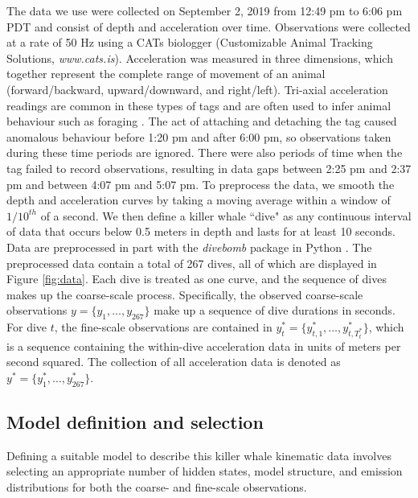 The data we use were collected on September 2, 2019 from 12:49 pm to 6:06 pm PDT and consist of depth and acceleration over time. Observations were collected at a rate of 50 Hz using a CATs biologger (Customizable Animal Tracking Solutions, {\em{www.cats.is}}). Acceleration was measured in three dimensions, which together represent the complete range of movement of an animal (forward/backward, upward/downward, and right/left). Tri-axial acceleration readings are common in these types of tags and are often used to infer animal behaviour such as foraging \citep{Cade:2017,Fehlmann:2017,Wright:2017}. The act of attaching and detaching the tag caused anomalous behaviour before 1:20 pm and after 6:00 pm, so observations taken during these time periods are ignored. There were also periods of time when the tag failed to record observations, resulting in data gaps between 2:25 pm and 2:37 pm and between 4:07 pm and 5:07 pm. To preprocess the data, we smooth the depth and acceleration curves by taking a moving average within a window of $1/10^{th}$ of a second. We then define a killer whale ``dive" as any continuous interval of data that occurs below 0.5 meters in depth and lasts for at least 10 seconds. Data are preprocessed in part with the \textit{divebomb} package in Python \citep{Nunes:2018}. The preprocessed data contain a total of 267 dives, all of which are displayed in Figure \ref{fig:data}. Each dive is treated as one curve, and the sequence of dives makes up the coarse-scale process. Specifically, the observed coarse-scale observations $y = \big\{y_1,\ldots,y_{267}\big\}$ make up a sequence of dive durations in seconds. For dive $t$, the fine-scale observations are contained in $y^*_{t} = \big\{y^*_{t,1},\ldots,y^*_{t,T^*_t} \big\}$, which is a sequence containing the within-dive acceleration data in units of meters per second squared. The collection of all acceleration data is denoted as $y^* = \big\{y^*_1,\ldots,y^*_{267}\big\}$.

\subsection{Model definition and selection}
\label{subsec:model_selection}

Defining a suitable model to describe this killer whale kinematic data involves selecting an appropriate number of hidden states, model structure, and emission distributions for both the coarse- and fine-scale observations.

